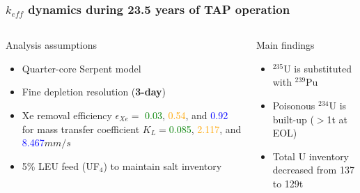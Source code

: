\begin{frame}
\frametitle{$k_{eff}$ dynamics during 23.5 years of TAP operation}
\vspace{-3mm}
\begin{columns}
	\column{4.3cm}
	\begin{block}{Analysis assumptions}
		\fontsize{7}{9}\selectfont
		\begin{itemize}
			\item Quarter-core Serpent model
			\item Fine depletion resolution (\textbf{3-day})
			\item Xe removal efficiency $\epsilon_{Xe}=$\textcolor{green}{
			0.03}, \textcolor{orange}{0.54}, and \textcolor{blue}{0.92} for 
			mass transfer coefficient $K_L=$\textcolor{green}{0.085}, 
			\textcolor{orange}{2.117}, and \textcolor{blue}{8.467}$mm/s$
			\item 5\% LEU feed (UF$_4$) to maintain salt inventory
		\end{itemize}
	\end{block}
	\vspace{-2mm}
	\begin{block}{Main findings}
		\fontsize{7}{9}\selectfont
		\begin{itemize}
			\item $^{235}$U is substituted with $^{239}$Pu
			\item Poisonous $^{234}$U is built-up ($>$1t at EOL)
			\item Total U inventory decreased from 137 to 129t
		\end{itemize}  
	\end{block}  	
	

\end{columns}
\end{frame}
